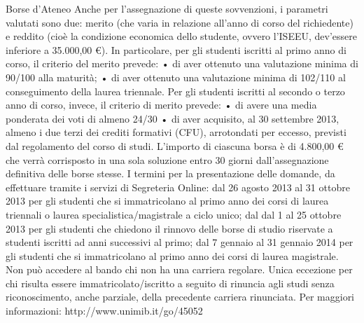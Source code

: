 Borse d'Ateneo
Anche per l'assegnazione di queste sovvenzioni, i parametri valutati sono due: merito (che varia in relazione all'anno di corso del richiedente) e reddito (cioè la condizione economica dello studente, ovvero l'ISEEU, dev'essere inferiore a 35.000,00 €). 
In particolare, per gli studenti iscritti al primo anno di corso, il criterio del merito prevede: 
      • di aver ottenuto una valutazione minima di 90/100 alla maturità; 
      • di aver ottenuto una valutazione minima di 102/110 al conseguimento della laurea triennale. 
Per gli studenti iscritti al secondo o terzo anno di corso, invece, il criterio di merito prevede: 
      • di avere una media ponderata dei voti di almeno 24/30 
      • di  aver acquisito, al 30 settembre 2013, almeno i  due terzi dei crediti formativi (CFU), arrotondati per eccesso, previsti dal regolamento del corso di studi. 
L'importo di ciascuna borsa è di 4.800,00 € che verrà corrisposto in una sola soluzione entro 30 giorni dall'assegnazione definitiva delle borse stesse.
I termini per la  presentazione delle domande, da effettuare tramite i servizi di Segreteria Online: dal 26 agosto 2013 al 31 ottobre 2013 per gli studenti che si immatricolano al primo anno dei corsi di laurea triennali o laurea specialistica/magistrale a ciclo unico; dal dal 1 al 25 ottobre 2013 per gli studenti che chiedono il rinnovo delle borse di studio riservate a studenti iscritti ad anni successivi al primo; dal 7 gennaio al 31 gennaio 2014 per gli studenti che si immatricolano al primo anno dei corsi di laurea magistrale. 
Non può accedere al bando chi non ha una carriera regolare. Unica eccezione per chi risulta essere immatricolato/iscritto a seguito di rinuncia agli studi senza riconoscimento, anche parziale, della precedente carriera rinunciata.
Per maggiori informazioni: http://www.unimib.it/go/45052
